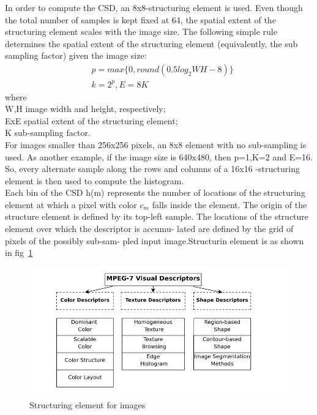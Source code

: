 In order to compute the CSD, an 8x8-structuring element is used. Even though the
total number of samples is kept fixed at 64, the spatial extent of the structuring element scales with
the image size. The following simple rule determines the spatial
extent of the structuring element (equivalently, the sub sampling
factor) given the image size:
\begin{align}
	&p=max \{0,round(0.5log_{2}WH-8)\} \nonumber \\
	&k=2^p, E=8K                     
\end{align}
where\\
W,H \quad image width and height, respectively;\\
ExE \quad spatial extent of the structuring element; \\
K   \qquad sub-sampling factor.\\
For images smaller than 256x256 pixels, an 8x8 element
with no sub-sampling is used. As another example, if the image
size is 640x480, then p=1,K=2 and E=16. So,
every alternate sample along the rows and columns of a 16x16
-structuring element is then used to compute the histogram.
\\
Each bin of the CSD h(m) represents
the number of locations of the structuring element at which a
pixel with color $c_{m}$ falls inside the element. The origin of the
structure element is defined by its top-left sample. The locations
of the structure element over which the descriptor is accumu-
lated are defined by the grid of pixels of the possibly sub-sam-
pled input image.Structurin element is as shown in fig~\ref{fig:structuring_element} 

\begin{figure}[h]
\centering
\includegraphics[width=5in]{Mpeg7}
\caption{Structuring element for images}
\label{fig:structuring_element}
\end{figure}
%






